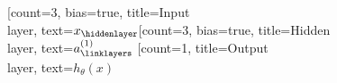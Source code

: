 \documentclass{article}
\begin{document}
\begin{neuralnetwork}[height=4]
  \newcommand{\x}[2]{$x_#2$}
  \newcommand{\h}[2]{\small $a^{(1)}_#2$}
  \newcommand{\y}[2]{$h_{\theta}(x)$}
  [count=3, bias=true, title=Input\\layer, text=\x]
  \hiddenlayer[count=3, bias=true, title=Hidden\\layer, text=\h] \linklayers
  \outputlayer[count=1, title=Output\\layer, text=\y] \linklayers
\end{neuralnetwork}
\end{document}
